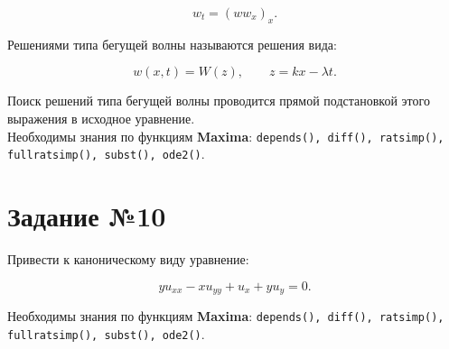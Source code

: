     \[
        w_{t} =  \left( w w_{x} \right)_{x}.
    \]

    Решениями типа бегущей волны называются решения вида:

    \[
        w(x, t) = W(z), \qquad z = k x - \lambda t.
    \]

    Поиск решений типа бегущей волны проводится прямой подстановкой этого выражения в исходное уравнение.\\

    Необходимы знания по функциям \textbf{Maxima}: {\tt depends(), diff(), ratsimp(), fullratsimp(), subst(), ode2()}.

\section*{Задание №10}

	Привести к каноническому виду уравнение:

	\[
		y u_{xx} - x u_{yy} + u_{x} + y u_{y} = 0.
	\]

	Необходимы знания по функциям \textbf{Maxima}: {\tt depends(), diff(), ratsimp(), fullratsimp(), subst(), ode2()}.

    \newpage
